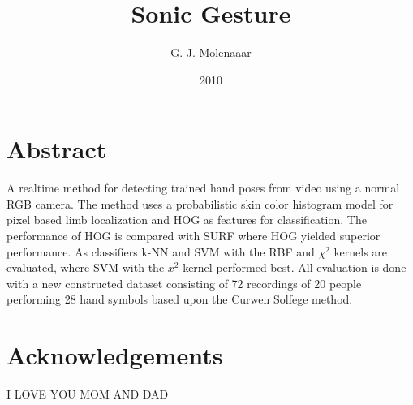 \documentclass[a4paper]{book}
\begin{document}
\title{Sonic Gesture}
\author{G. J. Molenaaar}
\date{2010}

\maketitle{}

\newpage{}

\chapter*{Abstract}
A real\-time method for detecting trained hand poses from video using a normal RGB camera. The method uses a probabilistic skin color histogram model for pixel based limb localization and HOG as features for classification. The performance of HOG is compared with SURF where HOG yielded superior performance. As classifiers k-NN and SVM with the RBF and $\chi^2$ kernels are evaluated, where SVM with the $x^2$ kernel performed best. All evaluation is done with a new constructed dataset consisting of 72 recordings of 20 people performing 28 hand symbols based upon the Curwen Solfege method. 


\tableofcontents{}
\listoffigures{}
\listoftables{}

\chapter*{Acknowledgements}
I LOVE YOU MOM AND DAD


















\end{document}
